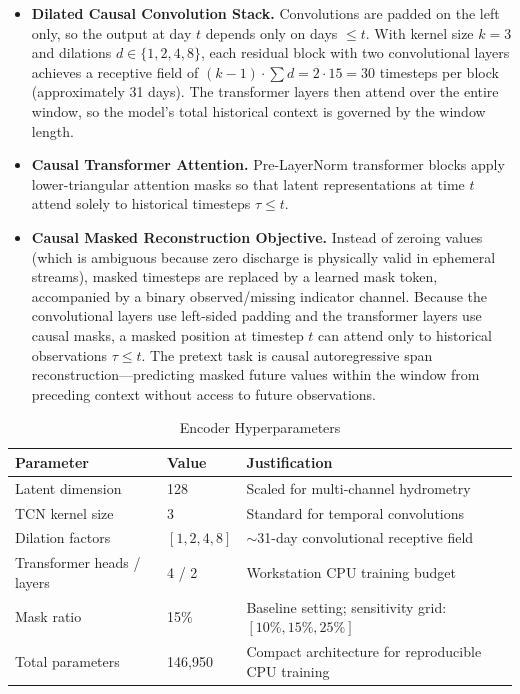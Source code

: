 \documentclass[12pt]{report}
\begin{document}
\begin{itemize}
  \item \textbf{Dilated Causal Convolution Stack.} Convolutions are padded on the left only, so the output at day $t$ depends only on days $\le t$. With kernel size $k=3$ and dilations $d \in \{1, 2, 4, 8\}$, each residual block with two convolutional layers achieves a receptive field of $(k-1) \cdot \sum d = 2 \cdot 15 = 30$ timesteps per block (approximately 31 days). The transformer layers then attend over the entire window, so the model's total historical context is governed by the window length.
  \item \textbf{Causal Transformer Attention.} Pre-LayerNorm transformer blocks apply lower-triangular attention masks so that latent representations at time $t$ attend solely to historical timesteps $\tau \le t$.
  \item \textbf{Causal Masked Reconstruction Objective.} Instead of zeroing values (which is ambiguous because zero discharge is physically valid in ephemeral streams), masked timesteps are replaced by a learned mask token, accompanied by a binary observed/missing indicator channel. Because the convolutional layers use left-sided padding and the transformer layers use causal masks, a masked position at timestep $t$ can attend only to historical observations $\tau \le t$. The pretext task is causal autoregressive span reconstruction—predicting masked future values within the window from preceding context without access to future observations.
\end{itemize}

\begin{table}[h]
  \caption{Encoder Hyperparameters}
  \label{tab:encoder}
  \centering
  \begin{tabular}{|l|l|l|}
    \hline
    \textbf{Parameter} & \textbf{Value} & \textbf{Justification} \\
    \hline
    Latent dimension & 128 & Scaled for multi-channel hydrometry \\
    \hline
    TCN kernel size & 3 & Standard for temporal convolutions \\
    \hline
    Dilation factors & $[1, 2, 4, 8]$ & $\sim$31-day convolutional receptive field \\
    \hline
    Transformer heads / layers & 4 / 2 & Workstation CPU training budget \\
    \hline
    Mask ratio & 15\% & Baseline setting; sensitivity grid: $[10\%, 15\%, 25\%]$ \\
    \hline
    Total parameters & 146,950 & Compact architecture for reproducible CPU training \\
    \hline
  \end{tabular}
\end{table}
\end{document}
